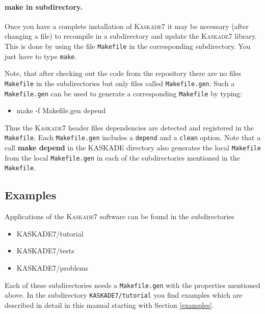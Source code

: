 \documentclass[11pt]{article}
\newcommand{\K}{\textsc{Kaskade7 }}
\begin{document}
\paragraph{make in subdirectory.}
Once you have a complete installation of \K it may be necessary (after changing a file) to recompile in
a subdirectory and update the \K library. This is done by using the file {\tt Makefile} in the
corresponding subdirectory. You just have to type {\tt make}.

Note, that after checking out the code from the repository there are no files {\tt Makefile} in 
the subdirectories but only files called {\tt Makefile.gen}. Such a {\tt Makefile.gen} can be used to
generate a corresponding {\tt Makefile} by typing:

\begin{itemize}
\item make -f Makefile.gen depend
\end{itemize}

\noindent Thus the \K header files dependencies are detected and registered in the {\tt Makefile}. 
Each {\tt Makefile.gen} includes
a {\tt depend} and a {\tt clean} option.
Note that a call {\bf make depend} in the KASKADE directory also generates the local {\tt Makefile} from
the local {\tt Makefile.gen} 
in each of the subdirectories mentioned in the {\tt Makefile}. 

\subsection{Examples}
Applications of the \K software can be found in the subdirectories

\begin{itemize}
\item KASKADE7/tutorial
\item KASKADE7/tests
\item KASKADE7/problems
\end{itemize}

\noindent Each of these subdirectories needs a {\tt Makefile.gen} with the properties mentioned above.
In the subdirectory {\tt KASKADE7/tutorial} you find examples which are described
in detail in this manual starting with Section \ref{examples}. 

\end{document}
